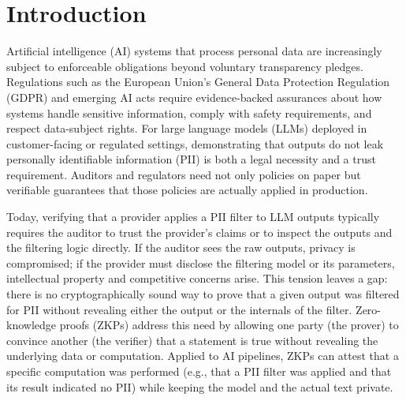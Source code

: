 \documentclass[10pt,conference,a4paper]{IEEEtran}
\begin{document}




\section{Introduction}

Artificial intelligence (AI) systems that process personal data are increasingly subject to enforceable obligations beyond voluntary transparency pledges. Regulations such as the European Union's General Data Protection Regulation (GDPR) and emerging AI acts require evidence-backed assurances about how systems handle sensitive information, comply with safety requirements, and respect data-subject rights. For large language models (LLMs) deployed in customer-facing or regulated settings, demonstrating that outputs do not leak personally identifiable information (PII) is both a legal necessity and a trust requirement. Auditors and regulators need not only policies on paper but verifiable guarantees that those policies are actually applied in production.

Today, verifying that a provider applies a PII filter to LLM outputs typically requires the auditor to trust the provider's claims or to inspect the outputs and the filtering logic directly. If the auditor sees the raw outputs, privacy is compromised; if the provider must disclose the filtering model or its parameters, intellectual property and competitive concerns arise. This tension leaves a gap: there is no cryptographically sound way to prove that a given output was filtered for PII without revealing either the output or the internals of the filter. Zero-knowledge proofs (ZKPs) address this need by allowing one party (the prover) to convince another (the verifier) that a statement is true without revealing the underlying data or computation. Applied to AI pipelines, ZKPs can attest that a specific computation was performed (e.g., that a PII filter was applied and that its result indicated no PII) while keeping the model and the actual text private.
\end{document}
